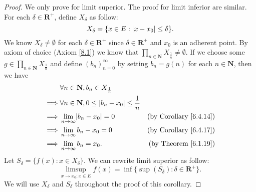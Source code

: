 \begin{proof}
    We only prove for limit superior.
    The proof for limit inferior are similar.
    For each \(\delta \in \mathbf{R}^+\), define \(X_{\delta}\) as follow:
    \[
        X_{\delta} = \{x \in E : \abs*{x - x_0} \leq \delta\}.
    \]
    We know \(X_{\delta} \neq \emptyset\) for each \(\delta \in \mathbf{R}^+\) since \(\delta \in \mathbf{R}^+\) and \(x_0\) is an adherent point.
    By axiom of choice (Axiom \ref{8.1}) we know that \(\prod_{n \in \mathbf{N}} X_{\frac{1}{n}} \neq \emptyset\).
    If we choose some \(g \in \prod_{n \in \mathbf{N}} X_{\frac{1}{n}}\) and define \((b_n)_{n = 0}^\infty\) by setting \(b_n = g(n)\) for each \(n \in \mathbf{N}\), then we have
    \begin{align*}
                 & \forall n \in \mathbf{N}, b_n \in X_{\frac{1}{n}}                                                       \\
        \implies & \forall n \in \mathbf{N}, 0 \leq \abs*{b_n - x_0} \leq \frac{1}{n}                                      \\
        \implies & \lim_{n \to \infty} \abs*{b_n - x_0} = 0                           & \text{(by Corollary \ref{6.4.14})} \\
        \implies & \lim_{n \to \infty} b_n - x_0 = 0                                  & \text{(by Corollary \ref{6.4.17})} \\
        \implies & \lim_{n \to \infty} b_n = x_0.                                     & \text{(by Theorem \ref{6.1.19})}
    \end{align*}
    Let \(S_{\delta} = \{f(x) : x \in X_{\delta}\}\).
    We can rewrite limit superior as follow:
    \[
        \limsup_{x \to x_0 ; x \in E} f(x) = \inf\{\sup(S_\delta) : \delta \in \mathbf{R}^+\}.
    \]
    We will use \(X_{\delta}\) and \(S_{\delta}\) throughout the proof of this corollary.


\end{proof}
